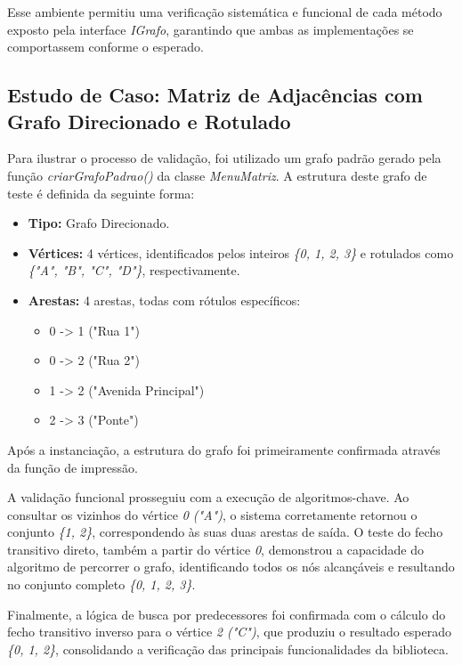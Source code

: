 \documentclass{sbc2023}%
\begin{document}
        Esse ambiente permitiu uma verificação sistemática e funcional de cada método exposto pela interface \textit{IGrafo}, garantindo que ambas as implementações se comportassem conforme o esperado.
    
    \subsection{Estudo de Caso: Matriz de Adjacências com Grafo Direcionado e Rotulado}

        Para ilustrar o processo de validação, foi utilizado um grafo padrão gerado pela função \textit{criarGrafoPadrao()} da classe \textit{MenuMatriz}. A estrutura deste grafo de teste é definida da seguinte forma:
        
        \begin{itemize}
            \item \textbf{Tipo:} Grafo Direcionado.
            \item \textbf{Vértices:} 4 vértices, identificados pelos inteiros \textit{\{0, 1, 2, 3\}} e rotulados como \textit{\{"A", "B", "C", "D"\}}, respectivamente.
            \item \textbf{Arestas:} 4 arestas, todas com rótulos específicos: \begin{itemize}
                \item 0 -> 1 ("Rua 1")
                \item 0 -> 2 ("Rua 2")
                \item 1 -> 2 ("Avenida Principal")
                \item 2 -> 3 ("Ponte")
            \end{itemize}
        \end{itemize}
        
        Após a instanciação, a estrutura do grafo foi primeiramente confirmada através da função de impressão.
        
        A validação funcional prosseguiu com a execução de algoritmos-chave. Ao consultar os vizinhos do vértice \textit{0 ("A")}, o sistema corretamente retornou o conjunto \textit{\{1, 2\}}, correspondendo às suas duas arestas de saída. O teste do fecho transitivo direto, também a partir do vértice \textit{0}, demonstrou a capacidade do algoritmo de percorrer o grafo, identificando todos os nós alcançáveis e resultando no conjunto completo \textit{\{0, 1, 2, 3\}}. 
        
        Finalmente, a lógica de busca por predecessores foi confirmada com o cálculo do fecho transitivo inverso para o vértice \textit{2 ("C")}, que produziu o resultado esperado \textit{\{0, 1, 2\}}, consolidando a verificação das principais funcionalidades da biblioteca.
\end{document}
